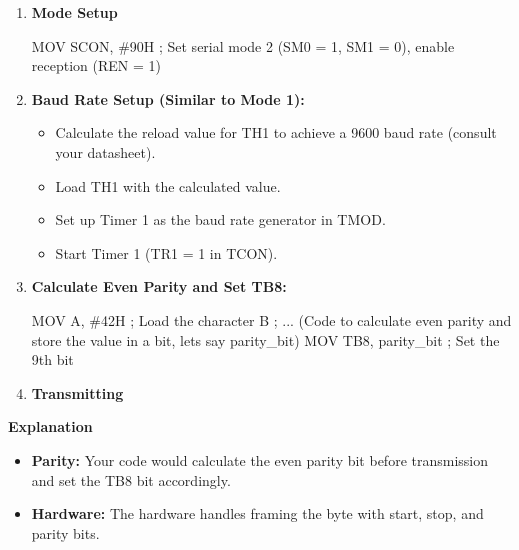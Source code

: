 \documentclass[
]{article}
\newenvironment{Shaded}{}{}
\newcommand{\NormalTok}[1]{#1}
\begin{document}
\begin{enumerate}
\def\labelenumi{\arabic{enumi}.}
\item
  \textbf{Mode Setup}

\begin{Shaded}
\begin{Highlighting}[]
\NormalTok{MOV SCON, \#90H ; Set serial mode 2 (SM0 = 1, SM1 = 0), enable reception (REN = 1)}
\end{Highlighting}
\end{Shaded}
\item
  \textbf{Baud Rate Setup (Similar to Mode 1):}

  \begin{itemize}
  \item
    Calculate the reload value for TH1 to achieve a 9600 baud rate
    (consult your datasheet).
  \item
    Load TH1 with the calculated value.
  \item
    Set up Timer 1 as the baud rate generator in TMOD.
  \item
    Start Timer 1 (TR1 = 1 in TCON).
  \end{itemize}
\item
  \textbf{Calculate Even Parity and Set TB8:}

\begin{Shaded}
\begin{Highlighting}[]
\NormalTok{MOV A, \#42H  ; Load the character \textquotesingle{}B\textquotesingle{}}
\NormalTok{; ... (Code to calculate even parity and store the value in a bit, let\textquotesingle{}s say \textquotesingle{}parity\_bit\textquotesingle{})}
\NormalTok{MOV TB8, parity\_bit ; Set the 9th bit}
\end{Highlighting}
\end{Shaded}
\item
  \textbf{Transmitting}

\begin{Shaded}
\end{Shaded}
\end{enumerate}

\textbf{Explanation}

\begin{itemize}
\item
  \textbf{Parity:} Your code would calculate the even parity bit before
  transmission and set the TB8 bit accordingly.
\item
  \textbf{Hardware:} The hardware handles framing the byte with start,
  stop, and parity bits.
\end{itemize}
\end{document}

